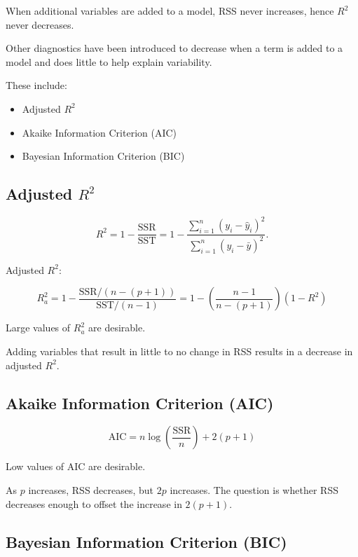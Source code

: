 \documentclass[]{book}
\providecommand{\tightlist}{%
  \setlength{\itemsep}{0pt}\setlength{\parskip}{0pt}}
\begin{document}
When additional variables are added to a model, RSS never increases,
hence \(R^2\) never decreases.

Other diagnostics have been introduced to decrease when a term is added
to a model and does little to help explain variability.

These include:

\begin{itemize}
\tightlist
\item
  Adjusted \(R^2\)
\item
  Akaike Information Criterion (AIC)\\
\item
  Bayesian Information Criterion (BIC)
\end{itemize}

\subsection{\texorpdfstring{Adjusted
\(R^2\)}{Adjusted R\^{}2}}\label{adjusted-r2}

\[
R^2 = 1 - \frac{\text{SSR}}{\text{SST}} = 1 - \frac{\sum_{i=1}^{n}(y_i - \hat{y}_i)^2}{\sum_{i=1}^{n}(y_i - \bar{y})^2}.
\]

Adjusted \(R^2\):

\[
R_a^2 = 1 - \frac{\text{SSR}/(n-(p+1))}{\text{SST}/(n-1)} = 1 - \left(  \frac{n-1}{n-(p+1)} \right)(1-R^2)
\]

Large values of \(R_a^2\) are desirable.

Adding variables that result in little to no change in RSS results in a
decrease in adjusted \(R^2\).

\subsection{Akaike Information Criterion
(AIC)}\label{akaike-information-criterion-aic}

\[
\text{AIC} = n\log\left(\frac{\text{SSR}}{n}\right) + 2(p+1)
\]

Low values of AIC are desirable.

As \(p\) increases, RSS decreases, but \(2p\) increases. The question is
whether RSS decreases enough to offset the increase in \(2(p+1)\).

\subsection{Bayesian Information Criterion
(BIC)}\label{bayesian-information-criterion-bic}
\end{document}
